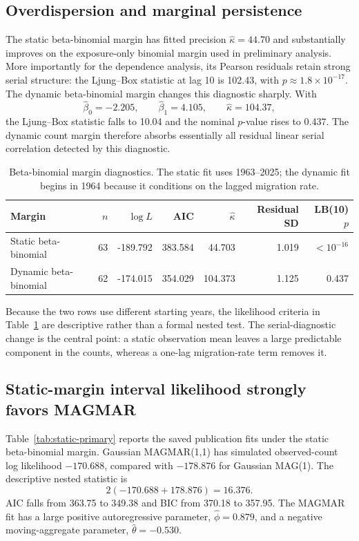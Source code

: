 \documentclass[11pt]{article}
\theoremstyle{definition}
\begin{document}
\subsection{Overdispersion and marginal persistence}
\label{subsec:margin-results}

The static beta-binomial margin has fitted precision
$\widehat\kappa=44.70$ and substantially improves on the exposure-only binomial
margin used in preliminary analysis. More importantly for the dependence analysis,
its Pearson residuals retain strong serial structure: the Ljung--Box statistic at
lag 10 is 102.43, with $p\approx1.8\times10^{-17}$. The dynamic beta-binomial margin
changes this diagnostic sharply. With
\[
\widehat\beta_0=-2.205,
\qquad
\widehat\beta_1=4.105,
\qquad
\widehat\kappa=104.37,
\]
the Ljung--Box statistic falls to 10.04 and the nominal $p$-value rises to 0.437.
The dynamic count margin therefore absorbs essentially all residual linear serial
correlation detected by this diagnostic.

\begin{table}[t]
\centering
\caption{Beta-binomial margin diagnostics. The static fit uses 1963--2025; the dynamic fit begins in 1964 because it conditions on the lagged migration rate.}
\label{tab:margin-results}
\begin{tabular}{lrrrrrr}
\toprule
Margin & $n$ & $\log L$ & AIC & $\widehat\kappa$ & Residual SD & LB(10) $p$ \\
\midrule
Static beta-binomial  & 63 & -189.792 & 383.584 & 44.703  & 1.019 & $<10^{-16}$ \\
Dynamic beta-binomial & 62 & -174.015 & 354.029 & 104.373 & 1.125 & 0.437 \\
\bottomrule
\end{tabular}
\end{table}

Because the two rows use different starting years, the likelihood criteria in
Table~\ref{tab:margin-results} are descriptive rather than a formal nested test. The
serial-diagnostic change is the central point: a static observation mean leaves a
large predictable component in the counts, whereas a one-lag migration-rate term
removes it.

\subsection{Static-margin interval likelihood strongly favors MAGMAR}
\label{subsec:static-results}

Table~\ref{tab:static-primary} reports the saved publication fits under the static
beta-binomial margin. Gaussian MAGMAR(1,1) has simulated observed-count log
likelihood $-170.688$, compared with $-178.876$ for Gaussian MAG(1). The descriptive
nested statistic is
\[
2(-170.688+178.876)=16.376.
\]
AIC falls from 363.75 to 349.38 and BIC from 370.18 to 357.95. The MAGMAR fit has a
large positive autoregressive parameter, $\widehat\phi=0.879$, and a negative
moving-aggregate parameter, $\widehat\theta=-0.530$.
\end{document}
